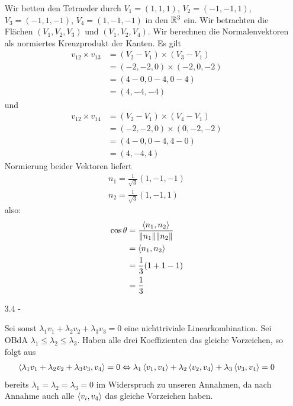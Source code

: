 \documentclass{article}
\begin{document}
\begin{enumerate}
		Wir betten den Tetraeder durch $V_1 = (1,1,1)$, $V_2 = (-1,-1,1)$, $V_3 = (-1,1,-1)$, $V_4 = (1,-1,-1)$ in den $\bR^3$ ein. Wir betrachten die Flächen $(V_1,V_2,V_3)$ und $(V_1,V_2,V_4)$. Wir berechnen die Normalenvektoren als normiertes Kreuzprodukt der Kanten. Es gilt
		\begin{align*}
			v_{12} \times v_{13} 
			&= 
			(V_2 - V_1) \times (V_3 - V_1)\\
			&=
			(-2,-2,0) 
			\times 
			(-2,0,-2)\\
			&= (4-0,0-4,0-4)\\
			&= (4,-4,-4)
		\end{align*}
		und
		\begin{align*}
			v_{12} \times v_{14}
			&= (V_2 - V_1) \times (V_4 - V_1)\\
			&= (-2,-2,0) 
			\times
			(0,-2,-2)\\
			&= (4-0,0-4,4-0)\\
			&= (4,-4,4)
		\end{align*}
		Normierung beider Vektoren liefert
		\begin{align*}
			n_1 = \frac{1}{\sqrt{3}}(1,-1,-1)\\
			n_2 =
			\frac{1}{\sqrt{3}}(1,-1,1)
		\end{align*}
		also:
		\begin{align*}
			\cos \theta 
			&= \frac{\scalar{n_1}{n_2}}{\norm{n_1}\norm{n_2}}\\
			&=
			\scalar{n_1}{n_2}\\
			&=
			\frac{1}{3}(1+1-1)\\
			&=
			\frac{1}{3}
		\end{align*}
		\item[3.4 - \tbf{4}]
		
		Sei sonst $\lambda_1 v_1 + \lambda_2 v_2 + \lambda_3 v_3 = 0$ eine nichttriviale Linearkombination. Sei OBdA $\lambda_1 \leq \lambda_2 \leq \lambda_3$. Haben alle drei Koeffizienten das gleiche Vorzeichen, so folgt aus
		\begin{align*}
			\left\langle \lambda_1 v_1 + \lambda_2 v_2 + \lambda_3 v_3, v_4 \right\rangle = 0
			\Leftrightarrow
			\lambda_1\left\langle v_1, v_4 \right\rangle + \lambda_2\left\langle v_2, v_4 \right\rangle + \lambda_3\left\langle v_3, v_4 \right\rangle= 0
		\end{align*}
		bereits $\lambda_1 = \lambda_2 = \lambda_3 = 0$ im Widerspruch zu unseren Annahmen, da nach Annahme auch alle $\left\langle v_i, v_4 \right\rangle$ das gleiche Vorzeichen haben.
		

\end{enumerate}
\end{document}
